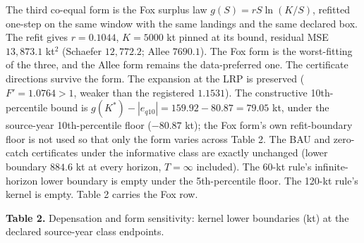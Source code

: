 \documentclass[11pt]{article}
\begin{document}
The third co-equal form is the Fox surplus law \(g(S) = rS\ln(K/S)\),
refitted one-step on the same window with the same landings and the same
declared box. The refit gives \(r = 0.1044\), \(K = 5000\) kt pinned at
its bound, residual MSE \(13{,}873.1\) kt\(^2\) (Schaefer
\(12{,}772.2\); Allee \(7690.1\)). The Fox form is the worst-fitting of
the three, and the Allee form remains the data-preferred one. The
certificate directions survive the form. The expansion at the LRP is
preserved (\(F' = 1.0764 > 1\), weaker than the registered \(1.1531\)).
The constructive 10th-percentile bound is
\(g(K^*) - |e_{q10}| = 159.92 - 80.87 = 79.05\) kt, under the
source-year 10th-percentile floor (\(-80.87\) kt); the Fox form's own
refit-boundary floor is not used so that only the form varies across
Table 2. The BAU and zero-catch certificates under the informative class
are exactly unchanged (lower boundary \(884.6\) kt at every horizon,
\(T=\infty\) included). The 60-kt rule's infinite-horizon lower boundary
is empty under the 5th-percentile floor. The 120-kt rule's kernel is
empty. Table 2 carries the Fox row.

\textbf{Table 2.} Depensation and form sensitivity: kernel lower
boundaries (kt) at the declared source-year class endpoints.
\end{document}
